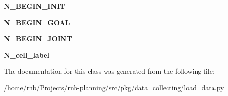 \begin{DoxyCompactItemize}
{\bfseries N\+\_\+\+B\+E\+G\+I\+N\+\_\+\+I\+N\+IT}
\item 
\mbox{\label{classrnb-planning_1_1src_1_1pkg_1_1data__collecting_1_1load__data_1_1_data_loader_a9f0a1ce05180f56d9b6e354f3c506687}} 
{\bfseries N\+\_\+\+B\+E\+G\+I\+N\+\_\+\+G\+O\+AL}
\item 
\mbox{\label{classrnb-planning_1_1src_1_1pkg_1_1data__collecting_1_1load__data_1_1_data_loader_a851965128f7bf22810efb7699df0b3c8}} 
{\bfseries N\+\_\+\+B\+E\+G\+I\+N\+\_\+\+J\+O\+I\+NT}
\item 
\mbox{\label{classrnb-planning_1_1src_1_1pkg_1_1data__collecting_1_1load__data_1_1_data_loader_ae997d3e91ddda58af32a13df4908e72a}} 
{\bfseries N\+\_\+cell\+\_\+label}
\end{DoxyCompactItemize}


The documentation for this class was generated from the following file\+:\begin{DoxyCompactItemize}
\item 
/home/rnb/\+Projects/rnb-\/planning/src/pkg/data\+\_\+collecting/load\+\_\+data.\+py\end{DoxyCompactItemize}
